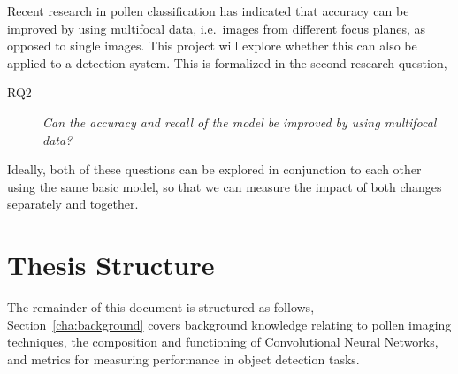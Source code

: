 Recent research in pollen classification has indicated that accuracy can be improved by using multifocal data, i.e.\ images from different focus planes, as opposed to single images.
This project will explore whether this can also be applied to a detection system.
This is formalized in the second research question,

\begin{description}
    \item[RQ2] \textit{Can the accuracy and recall of the model be improved by using multifocal data?}
\end{description}

Ideally, both of these questions can be explored in conjunction to each other using the same basic model, so that we can measure the impact of both changes separately and together.

\section{Thesis Structure}\label{sec:thesisStructure}
The remainder of this document is structured as follows,
Section~\ref{cha:background} covers background knowledge relating to pollen imaging techniques, the composition and functioning of Convolutional Neural Networks, and metrics for measuring performance in object detection tasks.